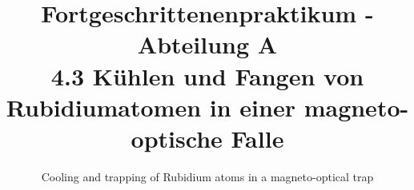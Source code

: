 \documentclass[
class=book,
accentcolor=1b,
custommargins=geometry,
fontsize=11pt,
thesis={type=Versuchsanleitung},
ruledheaders=all,
headline=false,
instbox=false,
marginpar=false,
title=small,
ignore-missing-data=true,
twoside=false,
logofile=apqdesign/tuda_logo.pdf,
pdfa=false %
]{apqpub}
\begin{document}
\renewcommand*{\figurename}{Abb.}
\renewcommand*{\tablename}{Tab.}
	
	
	\title{Fortgeschrittenenpraktikum - Abteilung A \\ 4.3 Kühlen und Fangen von Rubidiumatomen in einer magneto-optische Falle}
	\subtitle{Cooling and trapping of Rubidium atoms in a magneto-optical trap}
	
	
	\submissiondate{\today}
	\examdate{\today} %
	
	
	\maketitle
	\frontmatter
	
	 
\end{document}
